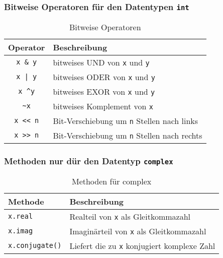 \begin{minipage}[t]{0.5\textwidth}
	\subsubsection{Bitweise Operatoren für den Datentypen \texttt{int}}
	\begin{table}[H]
	\begin{threeparttable}
	\caption{Bitweise Operatoren}
	\begin{tabular}{|c|l|}
		\hline 
		\textbf{Operator} &\textbf{Beschreibung}\\ 
		\hline 
		\texttt{x \& y} &bitweises UND von \texttt{x} und \texttt{y}\\ 
		\texttt{x | y} &bitweises ODER von \texttt{x} und \texttt{y}\\
		\texttt{x \textasciicircum y} &bitweises EXOR von \texttt{x} und \texttt{y}\\ 
		\texttt{\textasciitilde x} &bitweises Komplement von \texttt{x}\\ 
		\texttt{x << n} &Bit-Verschiebung um \texttt{n} Stellen nach links\\ 
		\texttt{x >> n} &Bit-Verschiebung um \texttt{n} Stellen nach rechts\\ 
		\hline 
	\end{tabular}
	\end{threeparttable}
	\end{table}
\end{minipage}

\subsubsection{Methoden nur dür den Datentyp \texttt{complex}}
\begin{table}[H]
\begin{threeparttable}
\caption{Methoden für complex}
\begin{tabular}{|l|l|}
	\hline 
	\textbf{Methode} &\textbf{Beschreibung}\\ 
	\hline 
	\texttt{x.real} &Realteil von \texttt{x} als Gleitkommazahl\\
	\texttt{x.imag} &Imaginärteil von \texttt{x} als Gleitkommazahl\\ 
	\texttt{x.conjugate()} &Liefert die zu \texttt{x} konjugiert komplexe Zahl\\  
	\hline 
\end{tabular}
\end{threeparttable}
\end{table}

